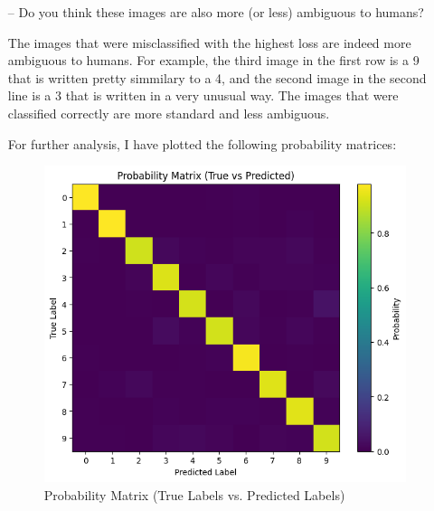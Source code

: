 \documentclass[a4paper, 12pt]{article}
\begin{document}
\begin{itemize}
    \item[--] \textcolor{myblue}{Do you think these images are also more (or less) ambiguous to humans?}
    \item[] 

        The images that were misclassified with the highest loss are indeed more ambiguous to humans.
        For example, the third image in the first row is a 9 that is written pretty simmilary to a 4, 
        and the second image in the second line is a 3 that is written in a very unusual way.
        The images that were classified correctly are more standard and less ambiguous.

        \smallskip
        For further analysis, I have plotted the following probability matrices:
        

        \begin{figure}[H]
            \centering
            \begin{minipage}{0.45\textwidth}
                \centering
                \includegraphics[width=\linewidth]{../figs/1-2-1--3.png}
                \caption{Probability Matrix (True Labels vs. Predicted Labels)}
                \label{fig:scenario1}
            \end{minipage}\hfill
            \begin{minipage}{0.45\textwidth}
                \centering

\end{minipage}
\end{figure}
\end{itemize}
\end{document}
